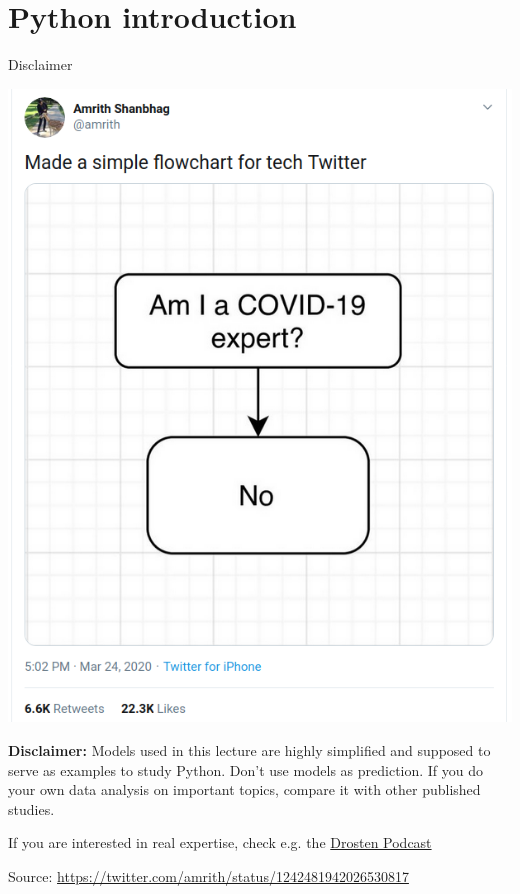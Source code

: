 \section{Python introduction}


\begin{frame}[fragile]{Disclaimer}
	\begin{center}
		\includegraphics[height=0.6\textheight]{covid-19-expert.png}
	\end{center}

	\pause
	\textbf{Disclaimer:} Models used in this lecture are highly simplified and supposed to serve as examples
	to study Python. Don't use models as prediction. If you do your own data analysis on important
	topics, compare it with other published studies.

	If you are interested in real expertise, check e.g. the \href{https://www.ndr.de/nachrichten/info/Corona-Podcast-Alle-Folgen-in-der-Uebersicht,podcastcoronavirus134.html}{Drosten Podcast}


	{\tiny Source: \href{https://twitter.com/amrith/status/1242481942026530817}{https://twitter.com/amrith/status/1242481942026530817}}
\end{frame}

